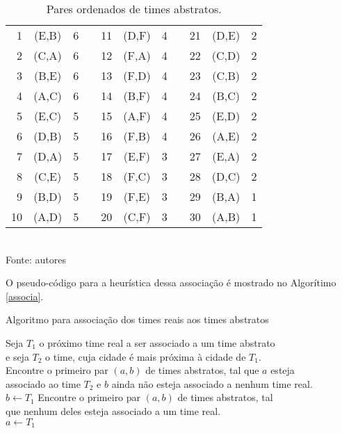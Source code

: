 \documentclass[12pt,a4paper]{article}
\makeatletter
\newcommand{\algorithmfootnote}[2][\footnotesize]{%
	\let\old@algocf@finish\@algocf@finish%
	\def\@algocf@finish{\old@algocf@finish%
		\leavevmode\rlap{\begin{minipage}{\linewidth}
				#1#2
		\end{minipage}}%
	}%
}
\makeatother
\begin{document}
\begin{table}[H]
	\centering
	\caption{Pares ordenados de times abstratos.}
	\label{tab:abstratos}
	\vspace{0.2cm}
	\begin{tabular}{rcc c rcc c rcc}
		\toprule
		 1 & (E,B) & 6 && 11 & (D,F) & 4 && 21 & (D,E) & 2 \\
		 2 & (C,A) & 6 && 12 & (F,A) & 4 && 22 & (C,D) & 2 \\
		 3 & (B,E) & 6 && 13 & (F,D) & 4 && 23 & (C,B) & 2 \\
		 4 & (A,C) & 6 && 14 & (B,F) & 4 && 24 & (B,C) & 2 \\
		 5 & (E,C) & 5 && 15 & (A,F) & 4 && 25 & (E,D) & 2 \\
		 6 & (D,B) & 5 && 16 & (F,B) & 4 && 26 & (A,E) & 2 \\
		 7 & (D,A) & 5 && 17 & (E,F) & 3 && 27 & (E,A) & 2 \\
		 8 & (C,E) & 5 && 18 & (F,C) & 3 && 28 & (D,C) & 2 \\
		 9 & (B,D) & 5 && 19 & (F,E) & 3 && 29 & (B,A) & 1 \\
		10 & (A,D) & 5 && 20 & (C,F) & 3 && 30 & (A,B) & 1 \\
		\bottomrule
	\end{tabular}
	\vspace{0.2cm}\\
	\footnotesize Fonte: autores
\end{table}

O pseudo-código para a heurística dessa associação é mostrado no Algorítimo \ref{associa}.

\begin{algorithm}[H]
	\caption{Algoritmo para associação dos times reais aos times abstratos}
	\algorithmfootnote{Fonte: \Citeauthor{marcio:jogos} \Citep{marcio:jogos}}
	\label{associa}
	 {
		Seja $T_{1}$ o próximo time real a ser associado a um time abstrato\\
		e seja $T_{2}$ o time, cuja cidade é mais próxima à cidade de $T_{1}$.\\
		 {
			Encontre o primeiro par $(a,b)$ de times abstratos, tal que $a$ esteja\\
			associado ao time $T_{2}$ e $b$ ainda não esteja associado a nenhum time real.\\
			$b \leftarrow T_{1}$ }
		{ Encontre o primeiro par $(a,b)$ de times abstratos, tal\\
			que nenhum deles esteja associado a um time real.\\
			$a \leftarrow T_{1}$ } }
\end{algorithm}
\vspace{0.5cm}
\end{document}
